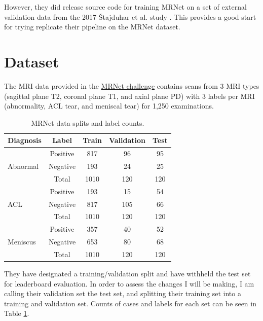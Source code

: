 \documentclass[10pt,twocolumn,letterpaper]{article}
\begin{document}
However, they did release source code for training MRNet on a set of external
validation data from the 2017 Štajduhar et al. study \cite{vstajduhar2017semi}.
This provides a good start for trying replicate their pipeline on the MRNet dataset.

\section{Dataset}

The MRI data provided in the
\href{https://stanfordmlgroup.github.io/competitions/mrnet/}{MRNet challenge}
contains scans from 3 MRI types (sagittal plane T2, coronal plane T1, and axial
plane PD) with 3 labels per MRI (abnormality, ACL tear, and meniscal tear) for
1,250 examinations.


\begin{table}
\begin{center}
\begin{tabular}{|lc|c|c|c|}
\hline
Diagnosis & Label & Train & Validation & Test \\
\hline\hline
\multirow{ 3}{*}{Abnormal} & Positive & 817 & 96 & 95 \\
                           & Negative & 193 & 24 & 25 \\
                           & Total & 1010 & 120 & 120 \\
\hline
\multirow{ 3}{*}{ACL}      & Positive & 193 & 15 & 54 \\
                           & Negative & 817 & 105 & 66 \\
                           & Total & 1010 & 120 & 120 \\
\hline
\multirow{ 3}{*}{Meniscus} & Positive & 357 & 40 & 52 \\
                           & Negative & 653 & 80 & 68 \\
                           & Total & 1010 & 120 & 120 \\
\hline
\end{tabular}
\end{center}
\caption{MRNet data splits and label counts.}
\label{tab:dataset}
\end{table}

They have designated a training/validation split and have withheld the test set
for leaderboard evaluation. In order to assess the
changes I will be making, I am calling their validation set the test set, and
splitting their training set into a training and validation set. Counts of
cases and labels for each set can be seen in Table \ref{tab:dataset}.
\end{document}
